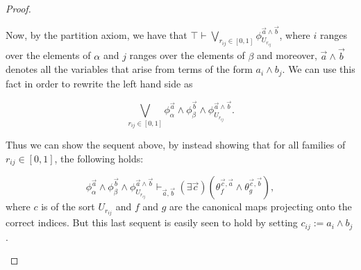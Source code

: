 \documentclass[a4paper]{amsproc}
\theoremstyle{plain}
\theoremstyle{definition}
\theoremstyle{remark}
\numberwithin{equation}{section}
\begin{document}
\begin{proof}
\begin{enumerate}
Now, by the partition axiom, we have that $\top \vdash \bigvee_{r_{ij} \in [0,1]} \phi_{U_{r_{ij}}}^{\vec{a}\wedge\vec{b}}$, where $i$ ranges over the elements of $\alpha$ and $j$ ranges over the elements of $\beta$ and moreover, $\vec{a}\wedge\vec{b}$ denotes all the variables that arise from terms of the form $a_i \wedge b_j$. We can use this fact in order to rewrite the left hand side as

\[
\bigvee_{r_{ij} \in [0,1]} \phi^{\vec{a}}_{\alpha} \wedge \phi^{\vec{b}}_{\beta} \wedge \phi_{U_{r_{ij}}}^{\vec{a}\wedge\vec{b}} .
\]

Thus we can show the sequent above, by instead showing that for all families of $r_{ij} \in [0,1]$, the following holds:

\[
\phi^{\vec{a}}_{\alpha} \wedge \phi^{\vec{b}}_{\beta} \wedge \phi_{U_{r_{ij}}}^{\vec{a}\wedge\vec{b}} \vdash_{\vec{a},\vec{b}} (\exists \vec{c})(\theta_f^{\vec{c},\vec{a}} \wedge \theta_g^{\vec{c},\vec{b}}) ,
\]
where $c$ is of the sort $U_{r_{ij}}$ and $f$ and $g$ are the canonical maps projecting onto the correct indices. But this last sequent is easily seen to hold by setting $c_{ij} := a_i \wedge b_j$.


\end{enumerate}
\end{proof}
\end{document}
